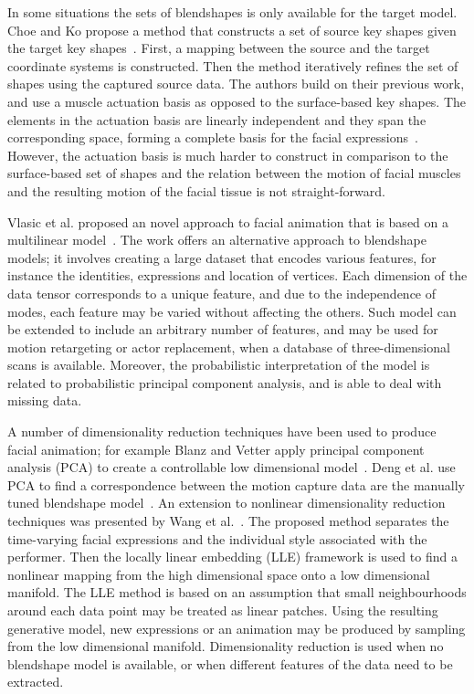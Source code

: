 In some situations the sets of blendshapes is only available for the target model. Choe and Ko propose a method that constructs a set of source key shapes given the target key shapes~\cite{Choe:2005}. First, a mapping between the source and the target coordinate systems is constructed. Then the method iteratively refines the set of shapes using the captured source data. The authors build on their previous work, and use a muscle actuation basis as opposed to the surface-based key shapes. The elements in the actuation basis are linearly independent and they span the corresponding space, forming a complete basis for the facial expressions~\cite{Choe:2001}. However, the actuation basis is much harder to construct in comparison to the surface-based  set of shapes and the relation between the motion of facial muscles and the resulting motion of the facial tissue is not straight-forward.

Vlasic et al. proposed an novel approach to facial animation that is based on a multilinear model~\cite{Vlasic:2005}. The work offers an alternative approach to blendshape models; it involves creating a large dataset that encodes various features, for instance the identities, expressions and location of vertices. Each dimension of the data tensor corresponds to a unique feature, and due to the independence of modes, each feature may be varied without affecting the others. Such model can be extended to include an arbitrary number of features, and may be used for motion retargeting or actor replacement, when a database of three-dimensional scans is available. Moreover, the probabilistic interpretation of the model is related to probabilistic principal component analysis, and is able to deal with missing data. 

A number of dimensionality reduction techniques have been used to produce facial animation; for example Blanz and Vetter apply principal component analysis (PCA) to create a controllable low dimensional model~\cite{Blanz:1999}. Deng et al. use PCA to find a correspondence between the motion capture data are the manually tuned blendshape model~\cite{Deng:2006}. An extension to nonlinear dimensionality reduction techniques was presented by Wang et al.~\cite{Wang:2004}. The proposed method separates the time-varying facial expressions and the individual style associated with the performer. Then the locally linear embedding (LLE) framework is used to find a nonlinear mapping from the high dimensional space onto a low dimensional manifold. The LLE method is based on an assumption that small neighbourhoods around each data point may be treated as linear patches. Using the resulting generative model, new expressions or an animation may be produced by sampling from the low dimensional manifold.
Dimensionality reduction is used when no blendshape model is available, or when different features of the data need to be extracted.

